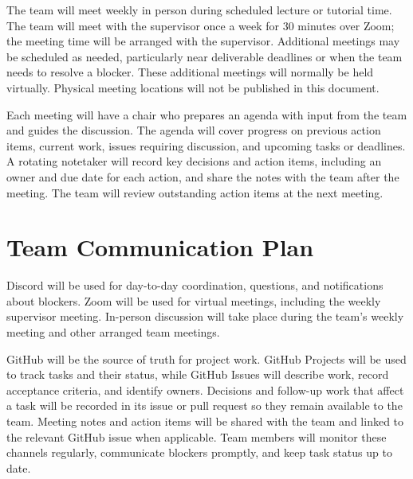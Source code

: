 \documentclass{article}
\begin{document}






The team will meet weekly in person during scheduled lecture or tutorial time.
The team will meet with the supervisor once a week for 30 minutes over Zoom;
the meeting time will be arranged with the supervisor. Additional meetings may
be scheduled as needed, particularly near deliverable deadlines or when the
team needs to resolve a blocker. These additional meetings will normally be
held virtually. Physical meeting locations will not be published in this
document.

Each meeting will have a chair who prepares an agenda with input from the team
and guides the discussion. The agenda will cover progress on previous action
items, current work, issues requiring discussion, and upcoming tasks or
deadlines. A rotating notetaker will record key decisions and action items,
including an owner and due date for each action, and share the notes with the
team after the meeting. The team will review outstanding action items at the
next meeting.


\section{Team Communication Plan}


Discord will be used for day-to-day coordination, questions, and notifications
about blockers. Zoom will be used for virtual meetings, including the weekly
supervisor meeting. In-person discussion will take place during the team's
weekly meeting and other arranged team meetings.

GitHub will be the source of truth for project work. GitHub Projects will be
used to track tasks and their status, while GitHub Issues will describe work,
record acceptance criteria, and identify owners. Decisions and follow-up work
that affect a task will be recorded in its issue or pull request so they remain
available to the team. Meeting notes and action items will be shared with the
team and linked to the relevant GitHub issue when applicable. Team members will
monitor these channels regularly, communicate blockers promptly, and keep task
status up to date.
\end{document}
